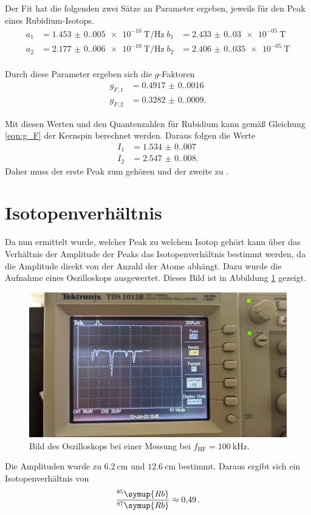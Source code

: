 Der Fit hat die folgenden zwei Sätze an Parameter ergeben, jeweils für den Peak eines Rubidium-Isotops.
\begin{align*}
    a_1 &=  \qty{1.453(0.005)e-10}{\tesla\per\hertz} \; b_1 &=  \qty{2.433(0.030)e-05}{\tesla}\\
    a_2 &=  \qty{2.177(0.006)e-10}{\tesla\per\hertz} \; b_2 &=  \qty{2.406(0.035)e-05}{\tesla}\\
\end{align*}

Durch diese Parameter ergeben sich die $g$-Faktoren 
\begin{align*}
    g_{F,1} &=  \num{0.4917(0.0016)}\\
    g_{F,2} &=  \num{0.3282(0.0009)}.
\end{align*}

Mit diesen Werten und den Quantenzahlen für Rubidium kann gemäß Gleichung \eqref{eqn:g_F} der Kernspin berechnet werden. 
Daraus folgen die Werte
\begin{align*}
    I_{1} &= \num{1.534(0.007)}\\
    I_{2} &= \num{2.547(0.008)}.
\end{align*}
Daher muss der erste Peak zum  gehören und der zweite zu .

\section{Isotopenverhältnis}
\label{sec:isotop}
Da nun ermittelt wurde, welcher Peak zu welchem Isotop gehört kann über das Verhältnis der Amplitude der Peaks das Isotopenverhältnis bestimmt werden, da die Amplitude direkt von der 
Anzahl der Atome abhängt. Dazu wurde die Aufnahme eines Oszilloskops ausgewertet. Dieses Bild ist in Abbildung \ref{fig:isotop} gezeigt.

\begin{figure}
    \centering
    \includegraphics[width = \textwidth]{content/v21_bilder/isotop.jpg}
    \caption{Bild des Oszilloskops bei einer Messung bei $f_{\mathrm{HF}} = \qty{100}{\kilo\hertz}$.}
    \label{fig:isotop}
\end{figure}

Die Amplituden wurde zu $\qty{6.2}{\centi\metre}$ und $\qty{12.6}{\centi\metre}$ bestimmt. Daraus ergibt sich ein Isotopenverhältnis von 
\begin{equation}
    \label{eqn:isotopen}
    \frac{^{85}\symup{Rb}}{^{87}\symup{Rb}} \approx \num{0.49}\,.
\end{equation}

